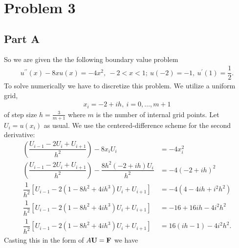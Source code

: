 \documentclass[12pt]{article}
\begin{document}
\section*{Problem 3}

\subsection*{Part A}
So we are given the the following boundary value problem
\begin{align}
    u^{\prime\prime}(x)-8xu(x) = -4x^{2},\ -2 < x <1;\ u(-2) = -1,\ u^{\prime}(1) = \dfrac{1}{2}.
\end{align}
To solve numerically we have to discretize this problem. We utilize a uniform grid,
\begin{align}
    x_{i} = -2 + ih,\ i = 0,\dots,m+1
\end{align}
of step size $h = \frac{3}{m+1}$ where $m$ is the number of internal grid points.
Let $U_{i} = u(x_{i})$ as usual. We use the centered-difference scheme for the second derivative:
\begin{subequations}
    \begin{align}
        \left(\dfrac{U_{i-1}-2U_{i}+U_{i+1}}{h^{2}}\right) - 8x_{i}U_{i} &= -4x_{i}^{2}\\
        \left(\dfrac{U_{i-1}-2U_{i}+U_{i+1}}{h^{2}}\right) - \dfrac{8h^{2}\left(-2+ih\right)U_{i}}{h^{2}} &= -4(-2+ih)^{2}\\
        \dfrac{1}{h^{2}}\left[U_{i-1}-2\left(1-8h^{2}+4ih^{3}\right)U_{i}+U_{i+1}\right] &= -4\left(4-4ih+i^{2}h^{2}\right)\\
        \dfrac{1}{h^{2}}\left[U_{i-1}-2\left(1-8h^{2}+4ih^{3}\right)U_{i}+U_{i+1}\right] &= -16+16ih-4i^{2}h^{2}\\
        \dfrac{1}{h^{2}}\left[U_{i-1}-2\left(1-8h^{2}+4ih^{3}\right)U_{i}+U_{i+1}\right] &= 16\left(ih-1\right)-4i^{2}h^{2}.
    \end{align}
\end{subequations}
Casting this in the form of $A\vb{U}=\vb{F}$ we have
\end{document}
